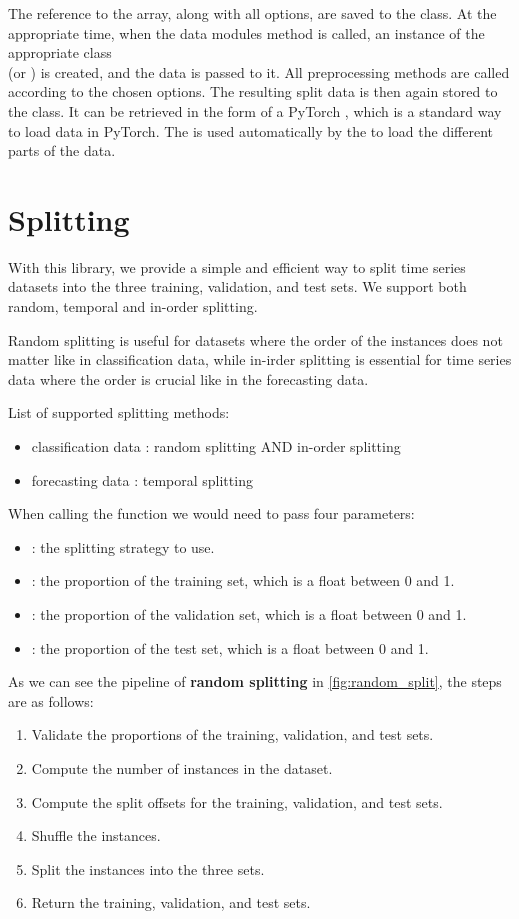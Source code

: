 \documentclass[review]{AIM_report}
\begin{document}
The reference to the \numpy array, along with all options, are saved to the class. At the appropriate time, when the data modules \setup method is called, an instance of the appropriate class\\
(\forecastingDataSet or \classificationDataSet) is created, and the data is passed to it. All preprocessing methods are called according to the chosen options. The resulting split data is then again stored to the \rustDM class. It can be retrieved in the form of a PyTorch \dataLoader, which is a standard way to load data in PyTorch. The \dataLoader is used automatically by the \lightningModule to load the different parts of the data.

\newpage
\section{Splitting}
With this library, we provide a simple and efficient way to split time series datasets into the three training, validation, and test sets. We support both random, temporal and in-order splitting.

Random splitting is useful for datasets where the order of the instances does not matter like in classification data, while in-irder splitting is essential for time series data where the order is crucial like in the forecasting data.

List of supported splitting methods:
\begin{itemize}
    \item classification data : random splitting AND in-order splitting
    \item forecasting data : temporal splitting
\end{itemize}

When calling the function \splitShort we would need to pass four parameters:
\begin{itemize}
    \item \splitStrategy: the splitting strategy to use.
    \item \trainProp: the proportion of the training set, which is a float between 0 and 1.
    \item \valProp: the proportion of the validation set, which is a float between 0 and 1.
    \item \testProp: the proportion of the test set, which is a float between 0 and 1.
\end{itemize}

As we can see the pipeline of \textbf{random splitting} in \autoref{fig:random_split}, the steps are as follows:
\begin{enumerate}
    \item Validate the proportions of the training, validation, and test sets.
    \item Compute the number of instances in the dataset.
    \item Compute the split offsets for the training, validation, and test sets.
    \item Shuffle the instances.
    \item Split the instances into the three sets.
    \item Return the training, validation, and test sets.
\end{enumerate}
\end{document}
